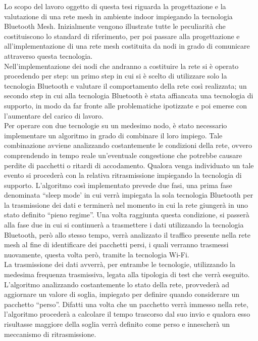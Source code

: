 \noindent Lo scopo del lavoro oggetto di questa tesi riguarda la progettazione e la valutazione di una rete mesh in ambiente indoor impiegando la tecnologia Bluetooth Mesh. Inizialmente vengono illustrate tutte le peculiarità che costituiscono lo standard di riferimento, per poi passare alla progettazione e all'implementazione di una rete mesh costituita da nodi in grado di comunicare attraverso questa tecnologia.\\ 
Nell'implementazione dei nodi che andranno a costituire la rete si è operato procedendo per step: un primo step in cui si è scelto di utilizzare solo la tecnologia Bluetooth e valutare il comportamento della rete così realizzata; un secondo step in cui alla tecnologia Bluetooth è stata affiancata una tecnologia di supporto, in modo da far fronte alle problematiche ipotizzate e poi emerse con l'aumentare del carico di lavoro.\\ 
Per operare con due tecnologie su un medesimo nodo, è stato necessario implementare un algoritmo in grado di combinare il loro impiego. Tale combinazione avviene analizzando costantemente le condizioni della rete, ovvero comprendendo in tempo reale un'eventuale congestione che potrebbe causare perdite di pacchetti o ritardi di accodamento. Qualora venga individuato un tale evento si procederà con la relativa ritrasmissione impiegando la tecnologia di supporto.
L'algoritmo così implementato prevede due fasi, una prima fase denominata ``sleep mode' in cui verrà impiegata la sola tecnologia Bluetooth per la trasmissione dei dati e terminerà nel momento in cui la rete giungerà in uno stato definito ``pieno regime''. 
Una volta raggiunta questa condizione, si passerà alla fase due in cui si continuerà a trasmettere i dati utilizzando la tecnologia Bluetooth, però allo stesso tempo, verrà analizzato il traffico presente nella rete mesh al fine di identificare dei pacchetti persi, i quali verranno trasmessi nuovamente, questa volta però, tramite la tecnologia Wi-Fi. \\
La trasmissione dei dati avverrà, per entrambe le tecnologie, utilizzando la medesima frequenza trasmissiva, legata alla tipologia di test che verrà eseguito.\\
L'algoritmo analizzando costantemente lo stato della rete, provvederà ad aggiornare un valore di soglia, impiegato per definire quando considerare un pacchetto ``perso''. Difatti una volta che un pacchetto verrà immesso nella rete, l'algoritmo procederà a calcolare il tempo trascorso dal suo invio e qualora esso risultasse maggiore della soglia verrà definito come perso e innescherà un meccanismo di ritrasmissione.\\ 
